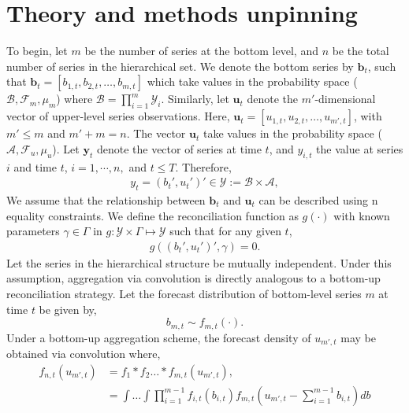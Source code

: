 \section{\texorpdfstring{Theory and methods unpinning }{Theory and methods unpinning }}\label{theory-and-methods-unpinning}

To begin, let \(m\) be the number of series at the bottom level, and \(n\) be the total number of series in the hierarchical set. We denote the bottom series by \(\boldsymbol{b}_t\), such that \(\boldsymbol{b}_t = [b_{1,t}, b_{2,t}, \dots, b_{m,t}]\) which take values in the probability space (\(\mathcal{B}, \mathcal{F}_{m}, \mu_{m}\)) where \(\mathcal{B} = \prod_{i=1}^{m} \mathcal{Y}_{i}\). Similarly, let \(\boldsymbol{u}_t\) denote the \(m'\)-dimensional vector of upper-level series observations. Here, \(\boldsymbol{u}_{t} = [u_{1,t}, u_{2,t}, \dots, u_{m',t}]\), with \(m' \leq m\) and \(m' + m = n\). The vector \(\boldsymbol{u}_{t}\) take values in the probability space (\(\mathcal{A}, \mathcal{F}_{u}, \mu_{u}\)). Let \(\boldsymbol{y}_{t}\) denote the vector of series at time \(t\), and \(y_{i,t}\) the value at series \(i\) and time \(t\), \(i = 1,\cdots,n,\) and \(t \leq T\). Therefore,
\begin{align}
    y_{t} = (b_t',  u_t')' \in \mathcal{Y}:= \mathcal{B} \times \mathcal{A},
\end{align}
We assume that the relationship between \(\boldsymbol{b}_t\) and \(\boldsymbol{u}_t\) can be described using n equality constraints. We define the reconciliation function as \(g(\cdot)\) with known parameters \(\gamma \in \Gamma\) in \(g: \mathcal{Y} \times \Gamma \mapsto \mathcal{Y}\) such that for any given \(t\),
\begin{align}
    g( (b_t',  u_t')', \gamma) = 0.
\end{align}
Let the series in the hierarchical structure be mutually independent. Under this assumption, aggregation via convolution is directly analogous to a bottom-up reconciliation strategy. Let the forecast distribution of bottom-level series \(m\) at time \(t\) be given by,
\begin{equation*}
    b_{m,t} \sim f_{m,t}(\cdot).
\end{equation*}
Under a bottom-up aggregation scheme, the forecast density of \(u_{m', t}\) may be obtained via convolution where,
\begin{align}
    \label{eqn_contconv}
    f_{n, t}(u_{m', t}) & = f_{1}*f_{2}\dots * f_{m,t}(u_{m', t}), \\ \nonumber
    &= \int \dots \int \prod_{i=1}^{m-1}f_{i,t}(b_{i,t})f_{m,t}(u_{m', t} - \sum_{i=1}^{m-1}b_{i,t})db
\end{align}
